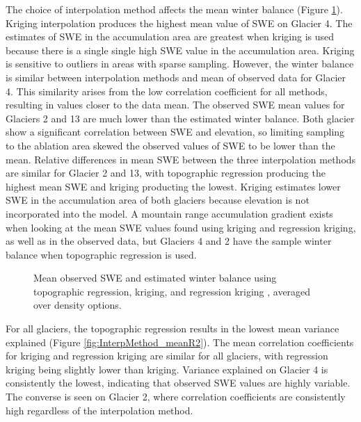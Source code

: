 \documentclass[12pt]{article}
\begin{document}
The choice of interpolation method affects the mean winter balance (Figure \ref{fig:InterpMethod_mean}). Kriging interpolation produces the highest mean value of SWE on Glacier 4. The estimates of SWE in the accumulation area are greatest when kriging is used because there is a single single high SWE value in the accumulation area. Kriging is sensitive to outliers in areas with sparse sampling. However, the winter balance is similar between interpolation methods and mean of observed data for Glacier 4. This similarity arises from the low correlation coefficient for all methods, resulting in values closer to the data mean. The observed SWE mean values for Glaciers 2 and 13 are much lower than the estimated winter balance. Both glacier show a significant correlation between SWE and elevation, so limiting sampling to the ablation area skewed the observed values of SWE to be lower than the mean. Relative differences in mean SWE between the three interpolation methods are similar for Glacier 2 and 13, with topographic regression producing the highest mean SWE and kriging producting the lowest. Kriging estimates lower SWE in the accumulation area of both glaciers because elevation is not incorporated into the model. A mountain range accumulation gradient exists when looking at the mean SWE values found using kriging and regression kriging, as well as in the observed data, but Glaciers 4 and 2 have the sample winter balance when topographic regression is used.

\begin{figure}
	\caption{Mean observed SWE and estimated winter balance using topographic regression, kriging, and regression kriging , averaged over density options.}
	\label{fig:InterpMethod_mean}
\end{figure}

For all glaciers, the topographic regression results in the lowest mean variance explained (Figure \ref{fig:InterpMethod_meanR2}). The mean correlation coefficients for kriging and regression kriging are similar for all glaciers, with regression kriging being slightly lower than kriging. Variance explained on Glacier 4 is consistently the lowest, indicating that observed SWE values are highly variable. The converse is seen on Glacier 2, where correlation coefficients are consistently high regardless of the interpolation method.
\end{document}
